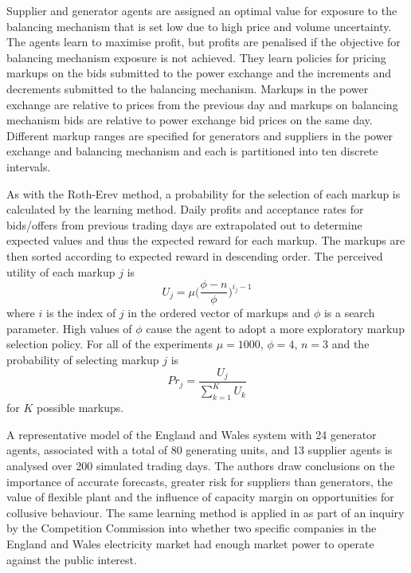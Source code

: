 Supplier and generator agents are assigned an optimal value for
exposure to the balancing mechanism that is set low due to high price and
volume uncertainty.  The agents learn to maximise profit, but profits are
penalised if the objective for balancing mechanism exposure is not
achieved.  They learn policies for pricing markups on the bids submitted
to the power exchange and the increments and decrements submitted to the
balancing mechanism.  Markups in the power exchange are relative to prices
from the previous day and markups on balancing mechanism bids are relative to
power exchange bid prices on the same day.  Different markup
ranges are specified for generators and suppliers in the power exchange and
balancing mechanism and each is partitioned into ten discrete intervals.

As with the Roth-Erev method, a probability for the selection of each markup is
calculated by the learning method.  Daily profits and acceptance rates for
bids/offers from previous trading days are extrapolated out to determine
expected values and thus the expected reward for each markup.  The markups are
then sorted according to expected reward in descending order.  The perceived
utility of each markup $j$ is
\begin{equation}
U_j = \mu \biggl(\frac{\phi - n}{\phi}\biggr)^{i_j-1}
\end{equation}
where $i$ is the index of $j$ in the ordered vector of markups and $\phi$ is a
search parameter.  High values of $\phi$ cause the agent to adopt a more
exploratory markup selection policy.  For all of the experiments $\mu = 1000$,
$\phi = 4$, $n = 3$ and the probability of selecting markup $j$ is
\begin{equation}
Pr_j = \frac{U_j}{\sum_{k=1}^K U_k}
\end{equation}
for $K$ possible markups.

A representative model of the England and Wales system with 24 generator agents,
associated with a total of 80 generating units, and 13 supplier agents is
analysed over 200 simulated trading days.  The authors draw conclusions on the
importance of accurate forecasts, greater risk for suppliers than generators,
the value of flexible plant and the influence of capacity margin on
opportunities for collusive behaviour. The same learning method is applied in
 as part of an inquiry by the Competition Commission into whether
two specific companies in the England and Wales electricity market had enough
market power to operate against the public interest.

